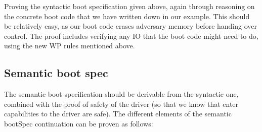 \documentclass{article}
\begin{document}
Proving the syntactic boot specification given above, again through reasoning on
the concrete boot code that we have written down in our example. This should be
relatively easy, as our boot code erases adversary memory before handing over
control. The proof includes verifying any IO that the boot code might need to
do, using the new WP rules mentioned above.

\subsection{Semantic boot spec}

The semantic boot specification should be derivable from the syntactic one,
combined with the proof of safety of the driver (so that we know that enter
capabilities to the driver are safe). The different elements of the semantic bootSpec continuation can be proven as follows:
\end{document}
